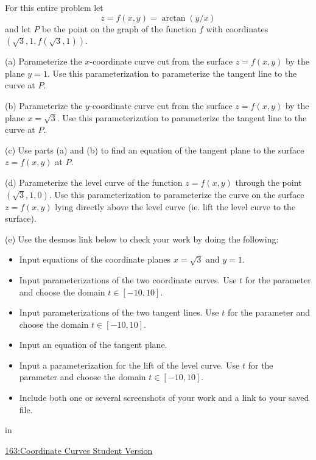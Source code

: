 \documentclass{ximera}
\newcommand{\pskip}{\vskip 0.1 in}
\begin{document}
\begin{example} \label{E4rt4t42}
For this entire problem let
\[
   z = f(x,y) = \arctan(y/x) 
\]
and let $P$ be the point on the graph of the function $f$ with coordinates $(\sqrt{3},1,f(\sqrt{3},1))$.

(a) Parameterize the $x$-coordinate curve cut from the surface $z=f(x,y)$ by the plane $y=1$. Use this parameterization to parameterize the tangent line to the curve at $P$.

(b) Parameterize the $y$-coordinate curve cut from the surface $z=f(x,y)$ by the plane $x=\sqrt{3}$. Use this parameterization to parameterize the tangent line to the curve at $P$.

(c) Use parts (a) and (b) to find an equation of the tangent plane to the surface $z=f(x,y)$ at $P$.

(d) Parameterize the level curve of the function $z=f(x,y)$ through the point $(\sqrt{3},1,0)$. Use this parameterization to parameterize the curve on the surface $z=f(x,y)$ lying directly above the level curve (ie. lift the level curve to the surface).

(e) Use the desmos link below to check your work by doing the following:

\begin{itemize}
\item{Input equations of the coordinate planes $x=\sqrt{3}$ and $y=1$.}

\item{Input parameterizations of the two coordinate curves. Use $t$ for the parameter and choose the domain $t\in[-10,10]$.}

\item{Input parameterizations of the two tangent lines. Use $t$ for the parameter and choose the domain $t\in[-10,10]$.}

\item{Input an equation of the tangent plane.}

\item{Input a parameterization for the lift of the level curve. Use $t$ for the parameter and choose the domain $t\in[-10,10]$.}

\item{Include both one or several screenshots of your work and a link to your saved file.}

\end{itemize}


\pskip 

\href{https://www.desmos.com/3d/ade9317b51}{163:Coordinate Curves Student Version}




\end{example}
\end{document}

